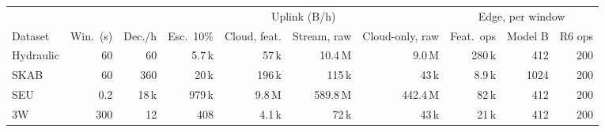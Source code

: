 \begin{tabular}{@{}l rr rrrr rrr@{}}
\toprule
& & & \multicolumn{4}{c}{Uplink (B/h)} & \multicolumn{3}{c}{Edge, per window} \\
\cmidrule(lr){4-7}\cmidrule(l){8-10}
Dataset & Win.\ (s) & Dec./h & Esc.\ 10\% & Cloud, feat. & Stream, raw & Cloud-only, raw & Feat.\ ops & Model B & R6 ops \\
\midrule
Hydraulic & 60 & 60 & 5.7\,k & 57\,k & 10.4\,M & 9.0\,M & 280\,k & 412 & 200 \\
SKAB & 60 & 360 & 20\,k & 196\,k & 115\,k & 43\,k & 8.9\,k & 1024 & 200 \\
SEU & 0.2 & 18\,k & 979\,k & 9.8\,M & 589.8\,M & 442.4\,M & 82\,k & 412 & 200 \\
3W & 300 & 12 & 408 & 4.1\,k & 72\,k & 43\,k & 21\,k & 412 & 200 \\
\bottomrule
\end{tabular}
